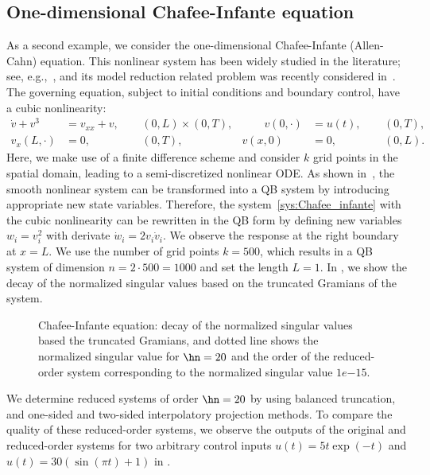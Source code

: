 \subsection{One-dimensional Chafee-Infante equation}
As a second example, we consider the one-dimensional Chafee-Infante (Allen-Cahn) equation. This nonlinear system has been widely studied in the literature; see, e.g.,~\cite{chafee1974bifurcation,hansen2012second}, and its model reduction related problem was recently considered in~\cite{morBenB15}. The governing equation, subject to  initial conditions and  boundary control,   have a cubic nonlinearity:
\begin{equation}\label{sys:Chafee_infante}
 \begin{aligned}
  \dot{v} +  v^3 &= v_{xx} + v, & ~~ &(0,L)\times (0,T),&\qquad
  v(0,\cdot)  &= u(t), & ~~ & (0,T),\\
  v_x(L,\cdot) &= 0, & ~~ & (0,T),&
  v(x,0) &= 0, & ~~ & (0,L).
 \end{aligned}
\end{equation}
Here, we  make use of a finite difference scheme and consider $k$ grid points in the spatial domain, leading to a semi-discretized nonlinear ODE. As shown in~\cite{morBenB15}, the smooth nonlinear system can be transformed into a QB system by introducing appropriate new state variables. Therefore, the system~\eqref{sys:Chafee_infante} with the cubic nonlinearity can be rewritten  in the QB form by defining  new variables $w_i = v_i^2$ with derivate  $\dot{w}_i = 2v_i\dot{v}_i$. We observe the response at the right boundary at $x = L$. We use the number of grid points $ k = 500$, which results in a QB system of  dimension $n = 2\cdot500 = 1000$  and  set the length $L = 1$. In , we show the decay of the normalized singular values based on the truncated Gramians of the system.

\begin{figure}[!tb]
\centering
	\setlength\fheight{3cm}
	\setlength\fwidth{6cm}
		\caption{Chafee-Infante equation: decay of the normalized singular values based the truncated Gramians, and dotted line shows the normalized singular value  for $\hn =  20$ and the order of the reduced-order system corresponding to the normalized singular value  $1e{-15}$.}
		\label{fig:1D_chafee_singular}
\end{figure}

We determine reduced systems of order $\hn =   20$ by using balanced truncation, and one-sided and two-sided interpolatory projection methods. To compare the quality of these reduced-order systems, we observe the outputs of the original and reduced-order  systems for two arbitrary control inputs $u(t) = 5t\exp(-t)$ and $u(t) = 30(\sin(\pi t)+1)$ in .

